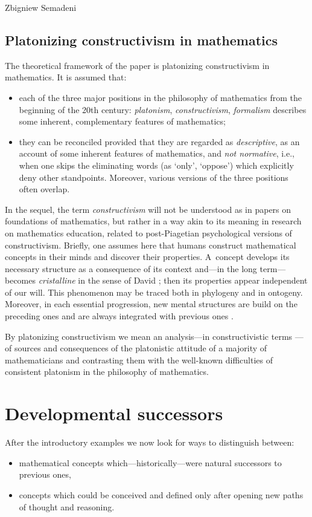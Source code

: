\begin{artengenv}{Zbigniew Semadeni}
\subsection{Platonizing constructivism in mathematics}
The theoretical framework of the paper is platonizing constructivism in mathematics. 
It is assumed that: 
\begin{itemize} 
\item each of the three major positions in the philosophy of mathematics from the beginning of 
the 20th century: \textit{platonism}, \textit{constructivism}, \textit{formalism} 
describes some inherent, complementary features of mathematics; 
\item they can be reconciled provided that they are regarded as \textit{descriptive}, 
as an account of some inherent features of mathematics, and \textit{not normative}, 
i.e., when one skips the eliminating words (as `only', `oppose') which explicitly deny 
other standpoints. Moreover, various versions of the three positions often overlap. 
\end{itemize}

\noindent In the sequel, the term \textit{constructivism} will not be understood as in papers on 
foundations of mathematics, but rather in a way akin to its meaning in research on mathematics 
education, related to post-Piagetian psychological versions of constructivism. 
Briefly, one assumes here that humans construct mathematical concepts in their minds  
and discover their properties. A~concept develops its necessary structure 
as a consequence of its context and---in the long term---becomes 
\textit{cristalline} in the sense of David \citeauthor{Tall} \parencite*[p.27]{Tall}; then its 
properties appear independent of our will. 
This phenomenon may be traced both in phylogeny and in ontogeny. 
Moreover, in each essential progression, new mental structures are build on the 
preceding ones and are always integrated with previous ones \parencite[pp.22--29]{P-G}.  

By platonizing constructivism we mean an analysis---in constructivistic terms 
--- of sources and consequences of the platonistic attitude of a majority of 
mathematicians and contrasting them with the well-known difficulties of consistent 
platonism in the philosophy of mathematics. 

\section{Developmental successors}
After the introductory examples we now look for ways to distinguish between: 
\begin{itemize}
\item mathematical concepts which---historically---were natural successors to 
previous ones,  
\item concepts which could be conceived and defined only 
after opening new paths of thought and reasoning. 
\end{itemize}


\end{artengenv}
